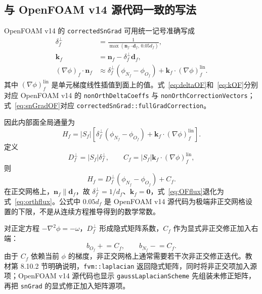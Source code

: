 \documentclass[UTF8,a4paper,11pt]{ctexart}
\newcommand{\vect}[1]{\bm{#1}}
\newcommand{\df}{\vect d_f}
\newcommand{\nf}{\vect n_f}
\newcommand{\kf}{\vect k_f}
\begin{document}
\subsection{与 OpenFOAM v14 源代码一致的写法}

OpenFOAM v14 的 \texttt{correctedSnGrad} 可用统一记号准确写成
\begin{align}
  \delta_f^{\perp}
  &=\frac{1}{\max\!\left(\nf\cdot\df,\,0.05d_f\right)},
  \label{eq:deltaOF}\\
  \kf&=\nf-\delta_f^{\perp}\df,
  \label{eq:kOF}\\
  (\nabla\phi)_f\cdot\nf
  &\approx \delta_f^{\perp}
  (\phi_{N_f}-\phi_{O_f})
  +\kf\cdot(\nabla\phi)_f^{\mathrm{lin}}.
  \label{eq:snGradOF}
\end{align}
其中 \((\nabla\phi)_f^{\mathrm{lin}}\) 是单元梯度线性插值到面上的值。式~\eqref{eq:deltaOF}和~\eqref{eq:kOF}分别对应 OpenFOAM v14 的
\texttt{nonOrthDelta\allowbreak Coeffs} 与
\texttt{nonOrthCorrection\allowbreak Vectors}\cite{OFsurface}；式~\eqref{eq:snGradOF}对应
\texttt{correctedSnGrad::\allowbreak fullGradCorrection}\cite{OFcorrected}。

因此内部面全局通量为
\begin{equation}
  \boxed{
  H_f=|S_f|\left[
  \delta_f^{\perp}(\phi_{N_f}-\phi_{O_f})
  +\kf\cdot(\nabla\phi)_f^{\mathrm{lin}}
  \right].}
  \label{eq:OFflux}
\end{equation}
定义
\begin{equation}
  D_f^{\perp}=|S_f|\delta_f^{\perp},
  \qquad
  C_f=|S_f|\kf\cdot(\nabla\phi)_f^{\mathrm{lin}},
  \label{eq:DC}
\end{equation}
则
\begin{equation}
  H_f=D_f^{\perp}(\phi_{N_f}-\phi_{O_f})+C_f.
  \label{eq:HDC}
\end{equation}
在正交网格上，\(\nf\parallel\df\)，故
\(\delta_f^{\perp}=1/d_f\)、\(\kf=\vect0\)，式~\eqref{eq:OFflux}退化为式~\eqref{eq:orthflux}。公式中 \(0.05d_f\) 是 OpenFOAM v14 源代码为极端非正交网格设置的下限，不是从连续方程推导得到的数学常数\cite{OFsurface}。

对正定方程 \(-\nabla^2\phi=-\omega\)，\(D_f^{\perp}\) 形成隐式矩阵系数，\(C_f\) 作为显式非正交修正加入右端：
\begin{equation}
  b_{O_f}\mathrel{+}=C_f,
  \qquad
  b_{N_f}\mathrel{-}=C_f.
  \label{eq:Cassembly}
\end{equation}
由于 \(C_f\) 依赖当前 \(\phi\) 的梯度，非正交网格上通常需要若干次非正交修正迭代。教材第 8.10.2 节明确说明，\texttt{fvm::laplacian} 返回隐式矩阵，同时将非正交项加入源项\cite[第 8.10.2 节及代码清单 8.5--8.9]{Moukalled2016}；OpenFOAM v14 源代码也显示 \texttt{gaussLaplacianScheme} 先组装未修正矩阵，再把 \texttt{snGrad} 的显式修正加入矩阵源项\cite{OFfvmlap}。
\end{document}
